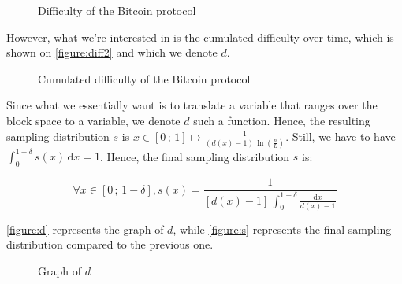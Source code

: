         \begin{figure}[ht]
          \centering
          \caption{Difficulty of the Bitcoin protocol}
          \label{figure:diff1}
        \end{figure}
        
        However, what we're interested in is the cumulated difficulty over time, which is shown on \autoref{figure:diff2} and which we denote \(d\).
        
        \begin{figure}[ht]
          \centering
          \caption{Cumulated difficulty of the Bitcoin protocol}
          \label{figure:diff2}
        \end{figure}
        
        Since what we essentially want is to translate a variable that ranges over the block space to a variable, we denote \(d\) such a function. Hence, the resulting sampling distribution \(s\) is \(x\in[0\,;\,1]\mapsto\frac{1}{(d(x) - 1)\,\ln\left(\frac{n}{L}\right)}\). Still, we have to have \(\int_0^{1-\delta}s(x)\,\mathrm{d}x=1\). Hence, the final sampling distribution \(s\) is:
        
        \[\forall x\in[0\,;\,1-\delta],s(x)=\frac{1}{[d(x)-1]\,\int_{0}^{1-\delta}\frac{\mathrm{d}x}{d(x)-1}}\]
        
        \autoref{figure:d} represents the graph of \(d\), while \autoref{figure:s} represents the final sampling distribution compared to the previous one.
                
        \begin{figure}[ht]
          \centering
          \caption{Graph of \(d\)}
          \label{figure:d}
        \end{figure}
        
